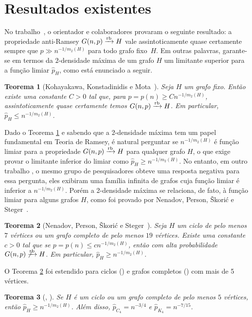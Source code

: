 \documentclass[12pt,a4paper]{book}
\def\rbarrow{\xrightarrow[]{\raisebox{0.0mm}[0mm]{$\scriptstyle \rm rb$}}}
\newtheorem{teorema}{Teorema}[chapter]
\begin{document}
\section{Resultados existentes}

No trabalho~\cite{KoKoMo12}, o orientador e colaboradores provaram o seguinte resultado: a propriedade anti-Ramsey $G(n,p)\rbarrow H$ vale assintoticamente quase certamente sempre que $p\gg n^{-1/m_2(H)}$ para todo grafo fixo~$H$. Em outras palavras, garante-se em termos da $2$-densidade máxima de um grafo $H$ um limitante superior para a função limiar $\hat{p}_H$, como está enunciado a seguir.

\begin{teorema}[Kohayakawa, Konstadinidis e Mota~\cite{KoKoMo12}]
    \label{teo:conditional}
         Seja $H$ um grafo fixo. Então existe uma constante $C>0$ tal que, para $p=p(n)\geq Cn^{-1/m_2(H)}$, assintoticamente quase certamente temos ${G(n,p)\rbarrow H}$. 
         Em particular, $\hat{p}_H \leq n^{-1/m_2(H)}$.
  \end{teorema}
    
Dado o Teorema \ref{teo:conditional} e sabendo que a $2$-densidade máxima tem um papel fundamental em Teoria de Ramsey, é natural perguntar se $n^{-1/m_2(H)}$ é função limiar para a propriedade $G(n,p)\rbarrow H$ para qualquer grafo $H$, o que exige provar o limitante inferior do limiar como $\hat{p}_H \geq n^{-1/m_2(H)}$.
No entanto, em outro trabalho \cite{KoKoMo16+}, o mesmo grupo de pesquisadores obteve uma resposta negativa para essa pergunta, eles exibiram uma família infinita de grafos cuja função limiar é inferior a $n^{-1/m_2(H)}$.
Porém a 2-densidade máxima se relaciona, de fato, à função limiar para alguns grafos $H$, como foi provado por Nenadov,
Person, Škorić e Steger~\cite{NePeSkSt14}.

\begin{teorema}[Nenadov, Person, Škorić e Steger~\cite{NePeSkSt14}]
\label{teo:nen}
  Seja $H$ um ciclo de pelo menos $7$ vértices ou um grafo completo de pelo menos $19$ vértices. 
  Existe uma constante $c > 0$ tal que se
  $p=p(n)\leq cn^{-1/m_2(H)}$, 
  então com alta probabilidade $G(n,p)\not\rbarrow  H$. 
  Em particular, $\hat{p}_H \geq n^{-1/m_2(H)}$.
\end{teorema}


O Teorema \ref{teo:nen} foi estendido para ciclos (\cite{barros2021anti}) e grafos completos (\cite{kohayakawa2019anti}) com mais de 5 vértices.

\begin{teorema}    
[\cite{barros2021anti},
\cite{kohayakawa2019anti}]
\label{teo:cyclecomplete} 
Se $H$ é um ciclo ou um grafo completo de pelo menos $5$ vértices, 
então $\hat{p}_{H} \geq n^{-1/m_2(H)}$. 
Além disso, $\hat{p}_{C_4} = n^{-3/4}$ 
e $\hat{p}_{K_4} = n^{-7/15}$.
\end{teorema}
\end{document}
